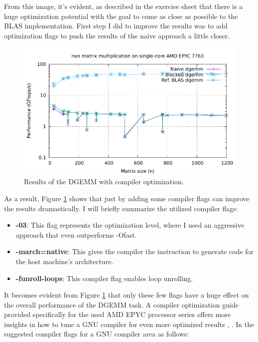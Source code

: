 \documentclass[unicode,11pt,a4paper,oneside,numbers=endperiod,openany]{scrartcl}
\begin{document}
From this image, it's evident, as described in the exercise sheet that there is a huge optimization potential with the 
goal to come as close as possible to the BLAS implementation. First step I did to improve the results was to add optimization 
flags to push the results of the naive approach a little closer.
\begin{figure}[H]
    \centering
    \includegraphics[width=\textwidth]{Images/timing_compiler_opt.pdf}
    \caption{Results of the DGEMM with compiler optimization.}
    \label{fig:compiler_opt}
\end{figure}
As a result, Figure \ref{fig:compiler_opt} shows that just by adding some compiler flags can improve the results dramastically.
I will briefly summarize the utilized compiler flags:
\begin{itemize}
    \item {\textbf{-03}: This flag represents the optimization level, where I used an aggressive approach that even outperforms
            -Ofast.} 
    \item \textbf{-march=native}: This gives the compiler the instruction to generate code for the host machine's architecture.
    \item \textbf{-funroll-loops}: This compiler flag enables loop unrolling.
\end{itemize}
It becomes evident from Figure \ref{fig:compiler_opt} that only these few flags have a huge effect on the overall performance of 
the DGEMM task. A compiler optimization guide provided specifically for the used AMD EPYC processor series offers more insights 
in how to tune a GNU compiler for even more optimized results \cite{compiler_opt_guide}, \cite{compiler_best_practice}. In \cite{compiler_best_practice} 
the suggested compiler flags for a GNU compiler area as follows:
\end{document}
